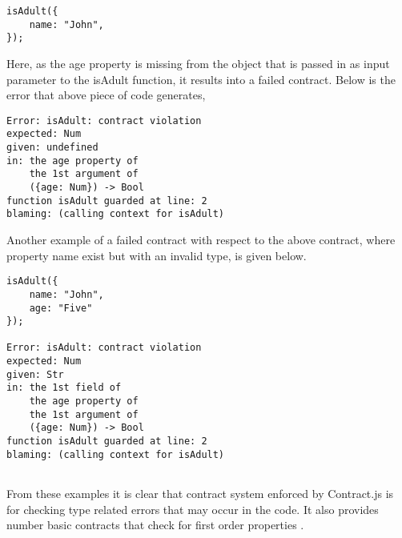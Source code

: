 \begin{minipage}{\linewidth}
\lstset{language=Java, caption=Example of a failed contract, captionpos=b}       
\begin{lstlisting}[frame=single]
isAdult({
    name: "John",
});    
\end{lstlisting}
\end{minipage}

Here, as the age property is missing from the object that is passed in as input parameter to the isAdult function, it results into a failed contract. Below is the error that above piece of code generates,
\linebreak

\begin{minipage}{\linewidth}
\lstset{language=Java, caption=Error message on failed contract, captionpos=b, breaklines=true}       
\begin{lstlisting}[frame=single]
Error: isAdult: contract violation
expected: Num
given: undefined
in: the age property of
    the 1st argument of
    ({age: Num}) -> Bool
function isAdult guarded at line: 2
blaming: (calling context for isAdult)

\end{lstlisting}
\end{minipage}


\begin{minipage}{\linewidth}
Another example of a failed contract with respect to the above contract, where property name exist but with an invalid type, is given below. \linebreak

\lstset{language=Java, caption=Example of a failed contract, captionpos=b, breaklines=true}       
\begin{lstlisting}[frame=single]
isAdult({
    name: "John",
    age: "Five"
});

Error: isAdult: contract violation
expected: Num
given: Str
in: the 1st field of
    the age property of
    the 1st argument of
    ({age: Num}) -> Bool
function isAdult guarded at line: 2
blaming: (calling context for isAdult)
    
\end{lstlisting}
\end{minipage}

From these examples it is clear that contract system enforced by Contract.js is for checking type related errors that may occur in the code. It also provides number basic contracts that check for first order properties \cite{Contract11:online}.    


